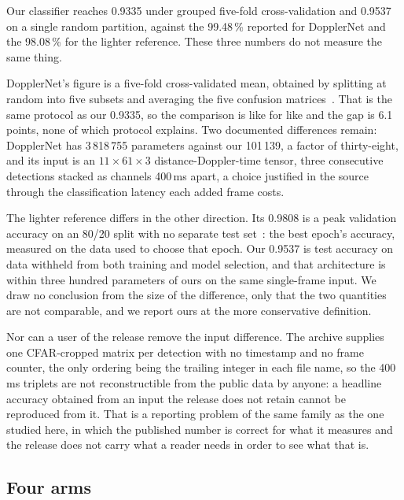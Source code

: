 \documentclass[11pt,a4paper]{article}
\begin{document}
Our classifier reaches 0.9335 under grouped five-fold cross-validation and 0.9537 on a single random partition, against the 99.48\,\% reported for DopplerNet and the 98.08\,\% for the lighter reference. These three numbers do not measure the same thing.

DopplerNet's figure is a five-fold cross-validated mean, obtained by splitting at random into five subsets and averaging the five confusion matrices~\cite{roldan2020}. That is the same protocol as our 0.9335, so the comparison is like for like and the gap is 6.1 points, none of which protocol explains. Two documented differences remain: DopplerNet has 3\,818\,755 parameters against our 101\,139, a factor of thirty-eight, and its input is an $11 \times 61 \times 3$ distance-Doppler-time tensor, three consecutive detections stacked as channels 400\,ms apart, a choice justified in the source through the classification latency each added frame costs.

The lighter reference differs in the other direction. Its 0.9808 is a peak validation accuracy on an 80/20 split with no separate test set~\cite{zhang2025}: the best epoch's accuracy, measured on the data used to choose that epoch. Our 0.9537 is test accuracy on data withheld from both training and model selection, and that architecture is within three hundred parameters of ours on the same single-frame input. We draw no conclusion from the size of the difference, only that the two quantities are not comparable, and we report ours at the more conservative definition.

Nor can a user of the release remove the input difference. The archive supplies one CFAR-cropped matrix per detection with no timestamp and no frame counter, the only ordering being the trailing integer in each file name, so the 400\,ms triplets are not reconstructible from the public data by anyone: a headline accuracy obtained from an input the release does not retain cannot be reproduced from it. That is a reporting problem of the same family as the one studied here, in which the published number is correct for what it measures and the release does not carry what a reader needs in order to see what that is.

\subsection{Four arms}
\end{document}
